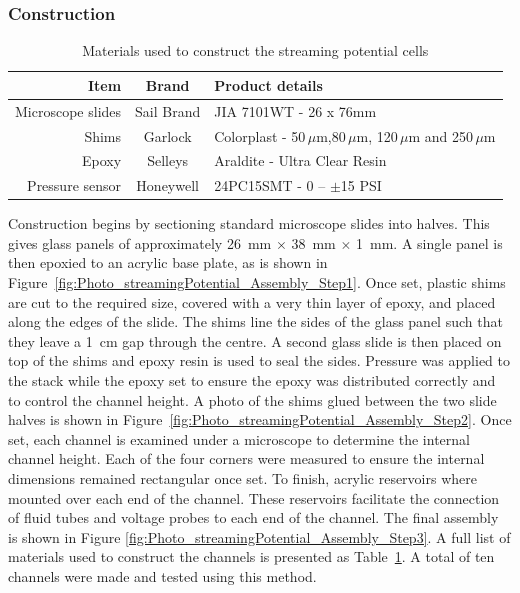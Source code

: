     \subsubsection*{Construction}

      \begin{table}
        \begin{tabular}{r|c|l}
          Item & Brand & Product details\tabularnewline\hline
          Microscope slides & Sail Brand & JIA 7101WT - 26 x 76mm\tabularnewline
          Shims & Garlock & Colorplast - 50$\,\mu$m,80$\,\mu$m, 120$\,\mu$m and 250$\,\mu$m\tabularnewline
          Epoxy & Selleys & Araldite - Ultra Clear Resin\tabularnewline
          Pressure sensor & Honeywell & 24PC15SMT - 0 -- $\pm$15 PSI\tabularnewline
        \end{tabular}
        \caption{\label{Table_StreamingCell_MaterialsUsed}Materials used to construct the streaming potential cells}
      \end{table}
      Construction begins by sectioning standard microscope slides into halves.
      This gives glass panels of approximately \SI{26}{\milli\meter} $\times$ \SI{38}{\milli\meter} $\times$ \SI{1}{\milli\meter}.
      A single panel is then epoxied to an acrylic base plate, as is shown in Figure~\ref{fig:Photo_streamingPotential_Assembly_Step1}.
      Once set, plastic shims are cut to the required size, covered with a very thin layer of epoxy, and placed along the edges of the slide.
      The shims line the sides of the glass panel such that they leave a \SI{1}{\centi\meter} gap through the centre.
      A second glass slide is then placed on top of the shims and epoxy resin is used to seal the sides.
      Pressure was applied to the stack while the epoxy set to ensure the epoxy was distributed correctly and to control the channel height.
      A photo of the shims glued between the two slide halves is shown in Figure~\ref{fig:Photo_streamingPotential_Assembly_Step2}.
      Once set, each channel is examined under a microscope to determine the internal channel height.
      Each of the four corners were measured to ensure the internal dimensions remained rectangular once set.
      To finish, acrylic reservoirs where mounted over each end of the channel.
      These reservoirs facilitate the connection of fluid tubes and voltage probes to each end of the channel.
      The final assembly is shown in Figure \ref{fig:Photo_streamingPotential_Assembly_Step3}.
      A full list of materials used to construct the channels is presented as Table~\ref{Table_StreamingCell_MaterialsUsed}.
      A total of ten channels were made and tested using this method.


